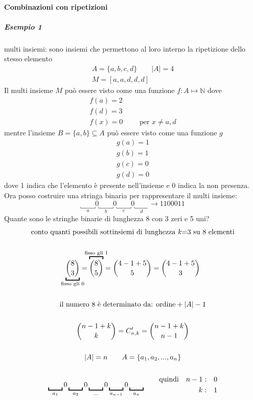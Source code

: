 \documentclass[italian]{article}
\newcommand{\ins}[1]{\text{$\mathbb{#1}$}}
\newcommand{\combr}[2]{\text{$C'_{#1,#2}$}}
\begin{document}
\paragraph{Combinazioni con ripetizioni}
\subparagraph{Esempio 1} multi insiemi: sono insiemi che permettono al loro interno la ripetizione dello stesso elemento
\begin{gather*}
	A = \{ a,b,c,d \} \qquad |A| = 4 \\
	M = [a,a,d,d,d] 
\end{gather*}
Il multi insieme $M$ può essere visto come una funzione $f: A \longmapsto \ins{N}$ dove
\begin{gather*}
	f(a) = 2 \\
	f(d) = 3 \\
	f(x) = 0 \qquad \text{ per } x\neq a,d
\end{gather*}
mentre l'insieme $B = \{ a,b \} \subseteq A$  può essere visto come una funzione $g$
\begin{gather*}
	g(a) = 1 \\
	g(b) = 1 \\
	g(c) = 0 \\
	g(d) = 0
\end{gather*}
dove 1 indica che l'elemento è presente nell'insieme e 0 indica la non presenza.\\

\noindent Ora posso costruire una stringa binaria per rappresentare il multi insieme:
\[
	\underbracket{\qquad}_{a}0\underbracket{\qquad}_{b}0\underbracket{\qquad}_{c}0\underbracket{\qquad}_{d} \to 1100011
\]
Quante sono le stringhe binarie di lunghezza 8 con 3 zeri e 5 uni?
\begin{gather*}
	\text{conto quanti possibili sottinsiemi di lunghezza $k$=3 su 8 elementi}\\\\
	\underbracket{\binom{8}{3}}_{\mathclap{\text{fisso gli 0}}} = \overbracket{\binom{8}{5}}^{\mathclap{\text{fisso gli 1}}} = \binom{4-1+5}{5} = \binom{4-1+5}{3} \\\\
	\text{il numero 8 è determinato da: } \text{ordine} + |A| - 1 \\\\
	\binom{n-1 + k}{k} = \combr{n}{k} = \binom{n-1 + k}{n-1} \\\\
	|A| = n \qquad A = \{ a_1,a_2,...,a_n \} \\\\
	\underbracket{\qquad}_{a_1}0\underbracket{\qquad}_{a_2}0\underbracket{\qquad}_{...}0\underbracket{\qquad}_{a_{n-1}}0\underbracket{\qquad}_{a_{n}} \qquad \begin{split}
	\text{quindi}\quad  n-1: \quad &0 \\
	 k: \quad & 1
	\end{split}
\end{gather*}
\end{document}
